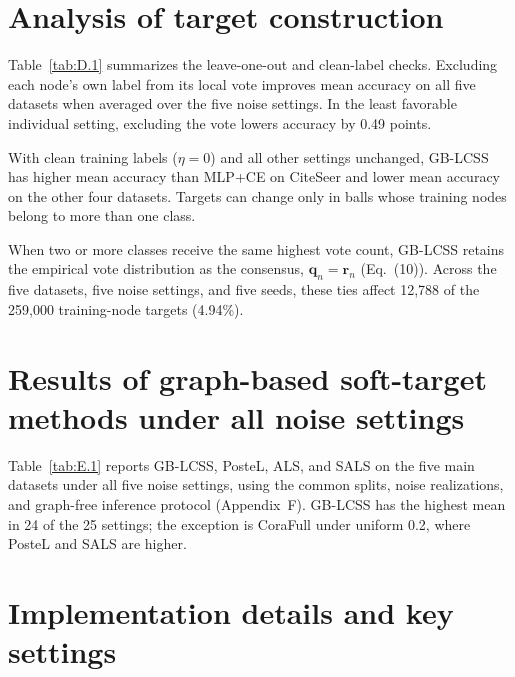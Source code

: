 \documentclass[10pt,letterpaper,nopreprintline]{elsarticle}
\begin{document}
\FloatBarrier

\setcounter{table}{0}

\section{Analysis of target construction}\label{sec:D}

Table~\ref{tab:D.1} summarizes the leave-one-out and clean-label checks. Excluding each node's own label from its local vote improves mean accuracy on all five datasets when averaged over the five noise settings. In the least favorable individual setting, excluding the vote lowers accuracy by 0.49 points.

With clean training labels (\(\eta=0\)) and all other settings unchanged, GB-LCSS has higher mean accuracy than MLP+CE on CiteSeer and lower mean accuracy on the other four datasets. Targets can change only in balls whose training nodes belong to more than one class.



When two or more classes receive the same highest vote count, GB-LCSS retains the empirical vote distribution as the consensus, \(\mathbf q_n=\mathbf r_n\) (Eq.~(10)). Across the five datasets, five noise settings, and five seeds, these ties affect 12,788 of the 259,000 training-node targets (4.94\%).

\FloatBarrier

\setcounter{table}{0}

\section{Results of graph-based soft-target methods under all noise settings}\label{sec:E}

Table~\ref{tab:E.1} reports GB-LCSS, PosteL, ALS, and SALS on the five main datasets under all five noise settings, using the common splits, noise realizations, and graph-free inference protocol (Appendix~F). GB-LCSS has the highest mean in 24 of the 25 settings; the exception is CoraFull under uniform 0.2, where PosteL and SALS are higher.



\FloatBarrier

\setcounter{table}{0}

\section{Implementation details and key settings}\label{sec:F}
\end{document}
